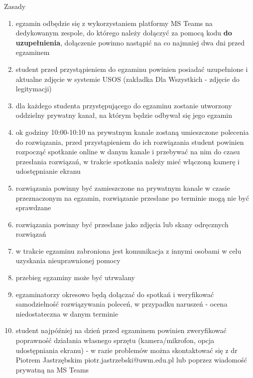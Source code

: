 \documentclass[12pt]{article}
\begin{document}
Zasady
\begin{enumerate}
\item egzamin odbędzie się z wykorzystaniem platformy MS Teams na dedykowanym zespole, do którego należy dołączyć za pomocą kodu \textbf{do uzupełnienia}, dołączenie powinno nastąpić na co najmniej dwa dni przed egzaminem
\item student przed przystąpieniem do egzaminu powinien posiadać uzupełnione i aktualne zdjęcie w systemie USOS (zakładka Dla Wszystkich - zdjęcie do legitymacji)
\item dla każdego studenta przystępującego do egzaminu zostanie utworzony oddzielny prywatny kanał, na którym będzie odbywał się jego egzamin
\item ok godziny 10:00-10:10 na prywatnym kanale zostaną umieszczone polecenia do rozwiązania, przed przystąpieniem do ich rozwiązania student powinien rozpocząć spotkanie online w danym kanale i przebywać na nim do czasu przesłania rozwiązań, w trakcie spotkania należy mieć włączoną kamerę i udostępnianie ekranu
\item rozwiązania powinny być zamieszczone na prywatnym kanale w czasie przeznaczonym na egzamin, rozwiązanie przesłane po terminie mogą nie być sprawdzane
\item rozwiązania powinny być przesłane jako zdjęcia lub skany odręcznych rozwiązań
\item w trakcie egzaminu zabroniona jest komunikacja z innymi osobami w celu uzyskania nieuprawnionej pomocy
\item przebieg egzaminy może być utrwalany
\item egzaminatorzy okresowo będą dołączać do spotkań i weryfikować samodzielność rozwiązywania poleceń, w przypadku naruszeń - ocena niedostateczna w danym terminie
\item student najpóźniej na dzień przed egzaminem powinien zweryfikować poprawność działania własnego sprzętu (kamera/mikrofon, opcja udostępniania ekranu) - w razie problemów można skontaktować się z dr Piotrem Jastrzębskim piotr.jastrzebski@uwm.edu.pl lub poprzez wiadomość prywatną na MS Teams
\end{enumerate}
\end{document}

